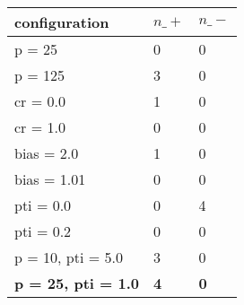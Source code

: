 \begin{tabular}{lll}
\hline
configuration              & $n\_+$       & $n\_-$       \\ \hline
p = 25                     & 0          & 0          \\
p = 125                    & 3          & 0          \\
cr = 0.0                   & 1          & 0          \\
cr = 1.0                   & 0          & 0          \\
bias = 2.0                 & 1          & 0          \\
bias = 1.01                & 0          & 0          \\
pti = 0.0                  & 0          & 4          \\
pti = 0.2                  & 0          & 0          \\
p = 10, pti = 5.0          & 3          & 0          \\
\textbf{p = 25, pti = 1.0} & \textbf{4} & \textbf{0} \\ \hline
\end{tabular}